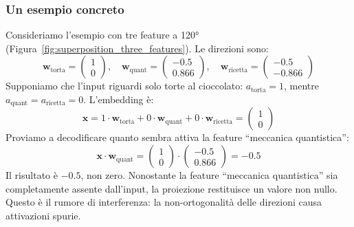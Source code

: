 \subsubsection{Un esempio concreto}
Consideriamo l'esempio con tre feature a 120° (Figura~\ref{fig:superposition_three_features}). Le direzioni sono:
\begin{equation}
    \mathbf{w}_{\text{torta}} = \begin{pmatrix} 1 \\ 0 \end{pmatrix}, \quad
    \mathbf{w}_{\text{quant}} = \begin{pmatrix} -0.5 \\ 0.866 \end{pmatrix}, \quad
    \mathbf{w}_{\text{ricetta}} = \begin{pmatrix} -0.5 \\ -0.866 \end{pmatrix}
\end{equation}
Supponiamo che l'input riguardi solo torte al cioccolato: $a_{\text{torta}} = 1$, mentre $a_{\text{quant}} = a_{\text{ricetta}} = 0$. L'embedding è:
\begin{equation}
    \mathbf{x} = 1 \cdot \mathbf{w}_{\text{torta}} + 0 \cdot \mathbf{w}_{\text{quant}} + 0 \cdot \mathbf{w}_{\text{ricetta}} = \begin{pmatrix} 1 \\ 0 \end{pmatrix}
\end{equation}
Proviamo a decodificare quanto sembra attiva la feature ``meccanica quantistica'':
\begin{equation}
    \mathbf{x} \cdot \mathbf{w}_{\text{quant}} = \begin{pmatrix} 1 \\ 0 \end{pmatrix} \cdot \begin{pmatrix} -0.5 \\ 0.866 \end{pmatrix} = -0.5
\end{equation}
Il risultato è $-0.5$, non zero. Nonostante la feature ``meccanica quantistica'' sia completamente assente dall'input, la proiezione restituisce un valore non nullo. Questo è il rumore di interferenza: la non-ortogonalità delle direzioni causa attivazioni spurie.
